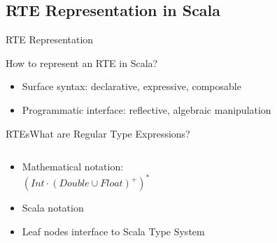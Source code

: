 \subsection{RTE Representation in Scala}


{  
\begin{frame}{ RTE Representation}

  How to represent an RTE in Scala?


  \medskip
  
  \begin{itemize}
  \item Surface syntax: declarative, expressive, composable
  \item Programmatic interface: reflective, algebraic manipulation
  \end{itemize}
\end{frame}
}

\newsavebox\exnotebox
\begin{lrbox}{\exnotebox}
  \begin{minipage}{6.5cm}
    
  \end{minipage}
\end{lrbox}


\begin{frame}{RTEs}{What are Regular Type Expressions?}
  \begin{columns}
    \begin{column}{0.55\textwidth}
  \begin{itemize}
  \item Mathematical notation:\\
  \quad\textcolor{greeny}{$(Int \cdot (Double \cup Float)^+)^*$}
  \item Scala notation\\
    \usebox\exnotebox
  \item Leaf nodes interface to Scala Type System
  \end{itemize}
    \end{column}%
    \begin{column}{0.45\textwidth}
      \scalebox{0.7}{}
    \end{column}%
  \end{columns}%
\end{frame}


\newsavebox\exampleAbox
\begin{lrbox}{\exampleAbox}
  \begin{minipage}{12cm}
    
  \end{minipage}
\end{lrbox}



